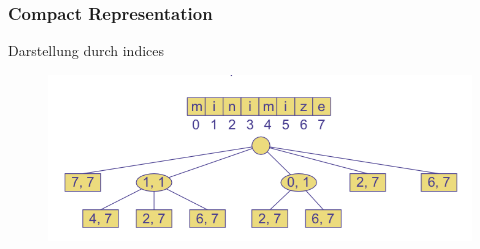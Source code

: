 \documentclass[a4paper,10pt]{report}
\begin{document}
\subsubsection{Compact Representation}
Darstellung durch indices
\begin{figure}[H]
	\begin{center}
  		\includegraphics[width=\textwidth]{img/suffixTrie2.png}
	\end{center}
\end{figure}
\newpage
\end{document}
